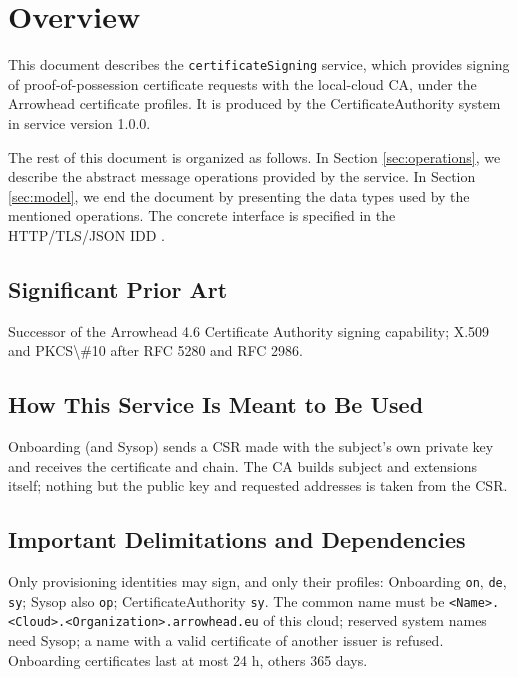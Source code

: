 \documentclass[a4paper]{arrowhead}
\begin{document}
\section{Overview}
\label{sec:overview}

This document describes the \texttt{certificateSigning} service, which provides signing of proof-of-possession certificate requests with the local-cloud CA, under the Arrowhead certificate profiles.
It is produced by the CertificateAuthority system \cite{cau-sysd} in service version 1.0.0.

The rest of this document is organized as follows.
In Section \ref{sec:operations}, we describe the abstract message operations provided by the service.
In Section \ref{sec:model}, we end the document by presenting the data types used by the mentioned operations.
The concrete interface is specified in the HTTP/TLS/JSON IDD \cite{cau-certificateSigning-http-idd}.

\subsection{Significant Prior Art}

Successor of the Arrowhead 4.6 Certificate Authority signing capability; X.509 and PKCS\textbackslash{}\#10 after RFC 5280 and RFC 2986.

\subsection{How This Service Is Meant to Be Used}

Onboarding (and Sysop) sends a CSR made with the subject's own private key and receives the certificate and chain. The CA builds subject and extensions itself; nothing but the public key and requested addresses is taken from the CSR.

\subsection{Important Delimitations and Dependencies}
\label{sec:delimitations}

Only provisioning identities may sign, and only their profiles: Onboarding \texttt{on}, \texttt{de}, \texttt{sy}; Sysop also \texttt{op}; Certificate\allowbreak{}Authority \texttt{sy}. The common name must be \texttt{\textless{}Name\textgreater{}.\allowbreak{}\textless{}Cloud\textgreater{}.\allowbreak{}\textless{}Organization\textgreater{}.\allowbreak{}arrowhead.\allowbreak{}eu} of this cloud; reserved system names need Sysop; a name with a valid certificate of another issuer is refused. Onboarding certificates last at most 24 h, others 365 days.
\end{document}
